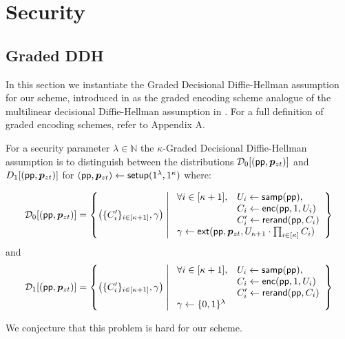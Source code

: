 \section{Security}

\subsection{Graded DDH}
In this section we instantiate the Graded Decisional Diffie-Hellman assumption for our scheme, introduced in \cite{ggh13a} as the graded encoding scheme analogue of the multilinear decisional Diffie-Hellman assumption in \cite{bs}.  For a full definition of graded encoding schemes, refer to Appendix A.

\begin{definition}
\label{kgddh}
For a security parameter $\lambda \in \mathbb{N}$ the $\kappa$-Graded Decisional Diffie-Hellman assumption is to distinguish between the distributions $\mathcal{D}_0[(\mathsf{pp}, \bm{p}_{zt})]$ and $D_1[(\mathsf{pp}, \bm{p}_{zt})]$ for $(\mathsf{pp}, \bm{p}_{zt}) \leftarrow \mathsf{setup}(1^\lambda, 1^\kappa)$ where: 

$$\mathcal{D}_0[(\mathsf{pp}, \pzt)] = \left\{ \left(\{C_i'\}_{i\in [\kappa + 1]}, \gamma \right) \;\middle|\; \begin{array}{ll}
\forall i \in [\kappa + 1], &  U_i \leftarrow \mathsf{samp}(\mathsf{pp}),\\
& C_i \leftarrow \mathsf{enc}(\mathsf{pp}, 1, U_i)\\
& C_i' \leftarrow \mathsf{rerand}(\mathsf{pp}, C_i)\\
\multicolumn{2}{l}{\gamma \leftarrow \mathsf{ext}(\mathsf{pp}, \pzt, U_{\kappa+1} \cdot\prod_{i \in [\kappa]} C_i)}
\end{array}\right\}$$
and
$$\mathcal{D}_1[(\mathsf{pp}, \pzt)] = \left\{ \left(\{C_i'\}_{i\in [\kappa + 1]}, \gamma \right) \;\middle|\; \begin{array}{ll}
\forall i \in [\kappa + 1], &  U_i \leftarrow \mathsf{samp}(\mathsf{pp}),\\
& C_i \leftarrow \mathsf{enc}(\mathsf{pp}, 1, U_i)\\
& C_i' \leftarrow \mathsf{rerand}(\mathsf{pp}, C_i)\\
\multicolumn{2}{l}{\gamma \leftarrow \{0,1\}^\lambda}
\end{array}\right\}$$
\end{definition}

We conjecture that this problem is hard for our scheme.

